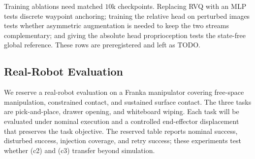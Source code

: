 \documentclass[letterpaper, 10 pt, conference]{ieeeconf}
\begin{document}
Training ablations need matched $10$k checkpoints. Replacing RVQ with an MLP tests discrete waypoint anchoring; training the relative head on perturbed images tests whether asymmetric augmentation is needed to keep the two streams complementary; and giving the absolute head proprioception tests the state-free global reference. These rows are preregistered and left as TODO.

\begin{table}[t]
\caption{Component ablations, success (\%). Full DUET and DUET-Rel are four-suite averages (clean $N{=}2000$; robot-state teleport medium $N{=}2000$; action-execution medium$+$severe $N{=}4000$). Entries marked $^\dagger$ are Object-only ($N{=}500$); the matched Object Full-DUET rates are $99.4\%$ clean and $84.4\%$ action-execution medium.}
\label{tab:ablations}
\centering
{}
\end{table}


\subsection{Real-Robot Evaluation}
We reserve a real-robot evaluation on a Franka manipulator covering free-space manipulation, constrained contact, and sustained surface contact. The three tasks are pick-and-place, drawer opening, and whiteboard wiping. Each task will be evaluated under nominal execution and a controlled end-effector displacement that preserves the task objective. The reserved table reports nominal success, disturbed success, injection coverage, and retry success; these experiments test whether (c2) and (c3) transfer beyond simulation.
\end{document}
